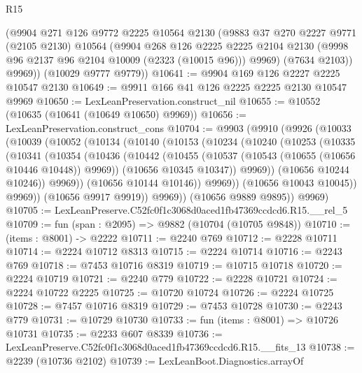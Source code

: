 \begin{lexlean}{R15}
\begin{coremodule}
        (@9904
          @271
          @126
          @9772
          @2225
          @10564
          @2130
          (@9883
            @37
            @270
            @2227
            @9771
            (@2105 @2130)
            @10564
            (@9904
              @268
              @126
              @2225
              @2225
              @2104
              @2130
              (@9998 @96 @2137 @96 @2104 @10009 (@2323 (@10015 @96)))
              @9969)
            (@7634 @2103))
          @9969))
      (@10029 @9777 @9779))
@10641 := @9904 @169 @126 @2227 @2225 @10547 @2130
@10649 := @9911 @166 @41 @126 @2225 @2225 @2130 @10547 @9969
@10650 := LexLeanPreservation.construct_nil
@10655 := @10552 (@10635 (@10641 (@10649 @10650) @9969))
@10656 := LexLeanPreservation.construct_cons
@10704 := @9903
    (@9910
      (@9926
        (@10033
          (@10039
            (@10052
              (@10134
                (@10140
                  (@10153
                    (@10234
                      (@10240
                        (@10253
                          (@10335
                            (@10341
                              (@10354
                                (@10436
                                  (@10442
                                    (@10455
                                      (@10537 (@10543 (@10655 (@10656 @10446 @10448)) @9969))
                                      (@10656 @10345 @10347))
                                    @9969))
                                (@10656 @10244 @10246))
                              @9969))
                          (@10656 @10144 @10146))
                        @9969))
                    (@10656 @10043 @10045))
                  @9969))
              (@10656 @9917 @9919))
            @9969))
        (@10656 @9889 @9895))
      @9969)
@10705 := LexLeanPreserve.C52fc0f1c3068d0aced1fb47369ccdcd6.R15.__rel_5
@10709 := fun (span : @2095) => @9882 (@10704 (@10705 @9848))
@10710 := (items : @8001) -> @2222
@10711 := @2240 @769
@10712 := @2228 @10711
@10714 := @2224 @10712 @8313
@10715 := @2224 @10714
@10716 := @2243 @769
@10718 := @7453 @10716 @8319
@10719 := @10715 @10718
@10720 := @2224 @10719
@10721 := @2240 @779
@10722 := @2228 @10721
@10724 := @2224 @10722 @2225
@10725 := @10720 @10724
@10726 := @2224 @10725
@10728 := @7457 @10716 @8319
@10729 := @7453 @10728
@10730 := @2243 @779
@10731 := @10729 @10730
@10733 := fun (items : @8001) => @10726 @10731
@10735 := @2233 @607 @8339
@10736 := LexLeanPreserve.C52fc0f1c3068d0aced1fb47369ccdcd6.R15.__fits_13
@10738 := @2239 (@10736 @2102)
@10739 := LexLeanBoot.Diagnostics.arrayOf

\end{coremodule}
\end{lexlean}
